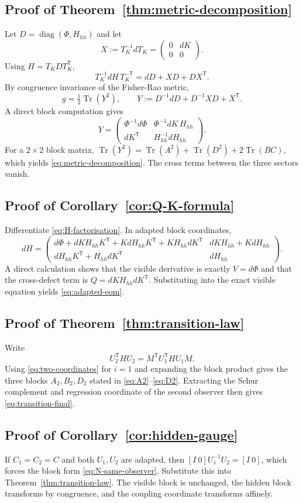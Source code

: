 \documentclass[11pt,a4paper]{article}
\numberwithin{equation}{section}
\DeclareMathOperator{\Tr}{Tr}
\DeclareMathOperator{\diag}{diag}
\theoremstyle{thmcompact}
\theoremstyle{remark}
\begin{document}
\subsection*{Proof of Theorem~\ref{thm:metric-decomposition}}
Let $D=\diag(\Phi,H_{hh})$ and let
\[
X:=T_K^{-1}dT_K=
\begin{pmatrix}
0 & dK\\
0 & 0
\end{pmatrix}.
\]
Using $H=T_KDT_K^{\mathsf T}$,
\[
T_K^{-1}dH\,T_K^{-\mathsf T}=dD+XD+DX^{\mathsf T}.
\]
By congruence invariance of the Fisher-Rao metric,
\[
g=\tfrac12\Tr(Y^2),
\qquad
Y:=D^{-1}dD + D^{-1}XD + X^{\mathsf T}.
\]
A direct block computation gives
\[
Y=
\begin{pmatrix}
\Phi^{-1}d\Phi & \Phi^{-1}dK\,H_{hh}\\
dK^{\mathsf T} & H_{hh}^{-1}dH_{hh}
\end{pmatrix}.
\]
For a $2\times2$ block matrix, $\Tr(Y^2)=\Tr(A^2)+\Tr(D^2)+2\Tr(BC)$, which yields \eqref{eq:metric-decomposition}. The cross terms between the three sectors vanish.

\subsection*{Proof of Corollary~\ref{cor:Q-K-formula}}
Differentiate \eqref{eq:H-factorisation}. In adapted block coordinates,
\[
dH=
\begin{pmatrix}
d\Phi + dK H_{hh}K^{\mathsf T}+K dH_{hh}K^{\mathsf T}+K H_{hh}dK^{\mathsf T} & dK H_{hh}+K dH_{hh}\\
dH_{hh}K^{\mathsf T}+H_{hh}dK^{\mathsf T} & dH_{hh}
\end{pmatrix}.
\]
A direct calculation shows that the visible derivative is exactly $V=d\Phi$ and that the cross-defect term is $Q=dK H_{hh}dK^{\mathsf T}$. Substituting into the exact visible equation yields \eqref{eq:adapted-eom}.

\subsection*{Proof of Theorem~\ref{thm:transition-law}}
Write
\[
U_2^{\mathsf T}HU_2 = M^{\mathsf T}U_1^{\mathsf T}HU_1M.
\]
Using \eqref{eq:two-coordinates} for $i=1$ and expanding the block product gives the three blocks $A_2,B_2,D_2$ stated in \eqref{eq:A2}--\eqref{eq:D2}. Extracting the Schur complement and regression coordinate of the second observer then gives \eqref{eq:transition-final}.

\subsection*{Proof of Corollary~\ref{cor:hidden-gauge}}
If $C_1=C_2=C$ and both $U_1,U_2$ are adapted, then $[I\ 0]U_1^{-1}U_2=[I\ 0]$, which forces the block form \eqref{eq:N-same-observer}. Substitute this into Theorem~\ref{thm:transition-law}. The visible block is unchanged, the hidden block transforms by congruence, and the coupling coordinate transforms affinely.
\end{document}
